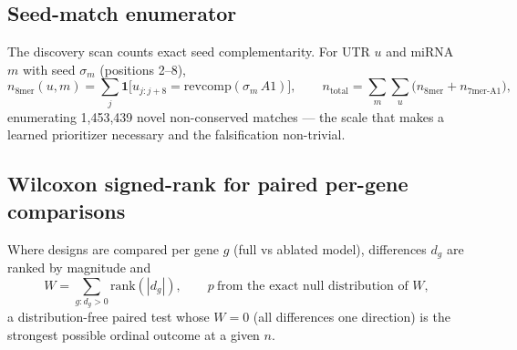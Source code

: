 \subsection{Seed-match enumerator}
The discovery scan counts exact seed complementarity. For UTR $u$ and miRNA
$m$ with seed $\sigma_m$ (positions 2--8),
\begin{equation}
n_{8\text{mer}}(u,m)=\sum_{j}\mathbf 1\big[u_{j:j+8}=\mathrm{revcomp}(\sigma_m\,A1)\big],\qquad
n_{\text{total}}=\sum_m\sum_u\big(n_{8\text{mer}}+n_{7\text{mer-A1}}\big),
\end{equation}
enumerating 1{,}453{,}439 novel non-conserved matches --- the scale that makes
a learned prioritizer necessary and the falsification non-trivial.

\subsection{Wilcoxon signed-rank for paired per-gene comparisons}
Where designs are compared per gene $g$ (full vs ablated model), differences
$d_g$ are ranked by magnitude and
\begin{equation}
W=\sum_{g:d_g>0}\mathrm{rank}(|d_g|),\qquad
p\ \text{from the exact null distribution of }W,
\end{equation}
a distribution-free paired test whose $W=0$ (all differences one direction) is
the strongest possible ordinal outcome at a given $n$.
